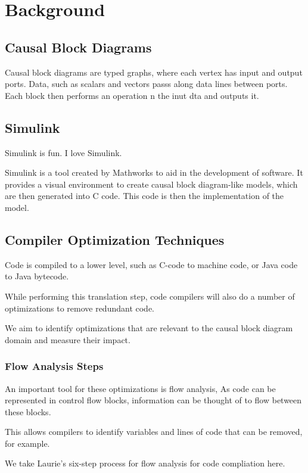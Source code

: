\section{Background}

\subsection{Causal Block Diagrams}
Causal block diagrams are typed graphs, where each vertex has input and output ports. Data, such as scalars and vectors passs along data lines between ports. Each block then performs an operation n the inut dta and outputs it.

\subsection{Simulink}

Simulink is fun. I love Simulink.

Simulink is a tool created by Mathworks to aid in the development of software. It provides a visual environment to create causal block diagram-like models, which are then generated into C code. This code is then the implementation of the model.


\subsection{Compiler Optimization Techniques}

Code is compiled to a lower level, such as C-code to machine code, or Java code to Java bytecode.

While performing this translation step, code compilers will also do a number of optimizations to remove redundant code.

We aim to identify optimizations that are relevant to the causal block diagram domain and measure their impact.




\subsubsection{Flow Analysis Steps}

An important tool for these optimizations is flow analysis, As code can be represented in control flow blocks, information can be thought of to flow between these blocks.

This allows compilers to identify variables and lines of code that can be removed, for example.

We take Laurie's six-step process for flow analysis for code compliation here.

